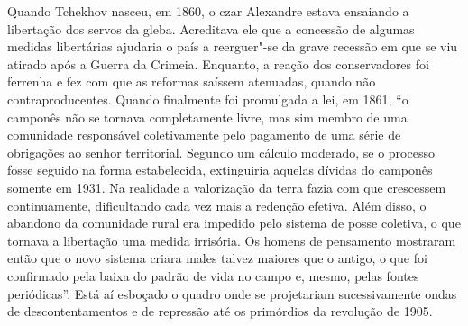 Quando Tchekhov nasceu, em 1860, o czar Alexandre  estava ensaiando a
libertação dos servos da gleba. Acreditava ele que a concessão de
algumas medidas libertárias ajudaria o país a reerguer"-se da grave
recessão em que se viu atirado após a Guerra da Crimeia. Enquanto, a
reação dos conservadores foi ferrenha e fez com que as reformas saíssem
atenuadas, quando não contraproducentes. Quando finalmente foi
promulgada a lei, em 1861, ``o camponês não se tornava completamente
livre, mas sim membro de uma comunidade responsável coletivamente pelo
pagamento de uma série de obrigações ao senhor territorial. Segundo um
cálculo moderado, se o processo fosse seguido na forma estabelecida,
extinguiria aquelas dívidas do camponês somente em 1931. Na realidade a
valorização da terra fazia com que crescessem continuamente,
dificultando cada vez mais a redenção efetiva. Além disso, o abandono da
comunidade rural era impedido pelo sistema de posse coletiva, o que
tornava a libertação uma medida irrisória. Os homens de pensamento
mostraram então que o novo sistema criara males talvez maiores que o
antigo, o que foi confirmado pela baixa do padrão de vida no campo e,
mesmo, pelas fontes periódicas''. Está aí esboçado o quadro onde se
projetariam sucessivamente ondas de descontentamentos e de repressão até
os primórdios da revolução de 1905.

